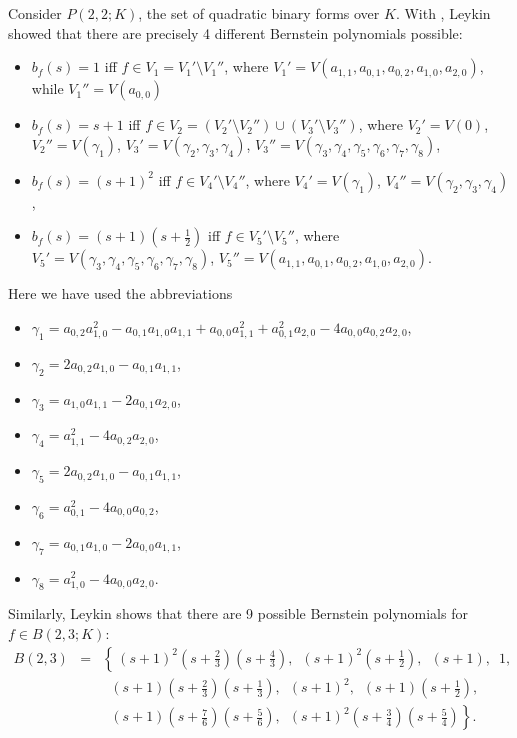 \begin{example}
Consider $P(2,2;K)$, the set of quadratic binary forms over $K$. With
\Mtwo, Leykin showed that there are
precisely 4 different Bernstein polynomials possible:
\def\labelitemi{$\bullet$}
\begin{itemize}
\item $b_{f}(s)=1$
iff $f\in V_{1}=V_{1}'\setminus V_{1}''$,
where $V_{1}'=V(a_{1,1},a_{0,1},a_{0,2},a_{1,0},a_{2,0}) $, while
$V_{1}''=V(a_{0,0})$
\item $ b_{f}(s)=s+1 $
iff $ f\in V_{2}=(V_{2}'\setminus V_{2}'')\cup (V_{3}'\setminus V_{3}'') $,
where $ V_{2}'=V(0) $, $ V_{2}''=V(\gamma _{1}) $,
$V_{3}'=V\left( \gamma _{2},\gamma _{3},\gamma _{4}\right)$, 
$V_{3}''=V\left( \gamma _{3},\gamma _{4},\gamma _{5},\gamma _{6},\gamma _{7},\gamma _{8}\right)  $,
\item $ b_{f}(s)=(s+1)^{2} $
iff $ f\in V_{4}'\setminus V_{4}'' $,
where $ V_{4}'=V(\gamma _{1}) $, 
$ V_{4}''=V\left( \gamma _{2},\gamma _{3},\gamma _{4}\right)  $, 
\item $ b_{f}(s)=(s+1)(s+\frac{1}{2}) $
iff $ f\in V_{5}'\setminus V_{5}'' $,
where $ V_{5}'=V\left( \gamma _{3},\gamma _{4},\gamma _{5},\gamma _{6},\gamma _{7},\gamma _{8}\right)  $,
$ V_{5}''=V(a_{1,1},a_{0,1},a_{0,2},a_{1,0},a_{2,0}) $.
\end{itemize}
Here we have used the abbreviations
\begin{itemize}
\item $ \gamma_{1}=
a_{0,2}a_{1,0}^{2}-a_{0,1}a_{1,0}a_{1,1}+a_{0,0}a_{1,1}^{2}+ 
a_{0,1}^{2}a_{2,0}-4a_{0,0}a_{0,2}a_{2,0}$, 
\item$ \gamma _{2}=2a_{0,2}a_{1,0}-a_{0,1}a_{1,1} $,

\item $ \gamma _{3}=a_{1,0}a_{1,1}-2a_{0,1}a_{2,0} $, 

\item $ \gamma _{4}=a_{1,1}^{2}-4a_{0,2}a_{2,0} $,

\item $ \gamma _{5}=2a_{0,2}a_{1,0}-a_{0,1}a_{1,1} $,

\item $ \gamma _{6}=a_{0,1}^{2}-4a_{0,0}a_{0,2} $,

\item $ \gamma _{7}=a_{0,1}a_{1,0}-2a_{0,0}a_{1,1} $, 

\item $ \gamma _{8}=a_{1,0}^{2}-4a_{0,0}a_{2,0} $.
\end{itemize}
Similarly, Leykin shows that there are 9 possible Bernstein
polynomials for $f\in B(2,3;K)$:
\begin{eqnarray*}
B(2,3)&=&\left\{\,
 (s+1)^{2}(s+\frac{2}{3})(s+\frac{4}{3}),\,\,\,(s+1)^{2}(s+\frac{1}{2}),\,\,\,(s+1),\,\,\,1,\right.\\ 
 &  &\phantom{x}(s+1)(s+\frac{2}{3})(s+\frac{1}{3}),\,\,\,(s+1)^{2},\,\,\,(s+1)(s+\frac{1}{2}),\\
 &  &\phantom{x}\left.(s+1)(s+\frac{7}{6})(s+\frac{5}{6}),\,\,\,(s+1)^{2}(s+\frac{3}{4})(s+\frac{5}{4})\right\}.
\end{eqnarray*}
\end{example}
